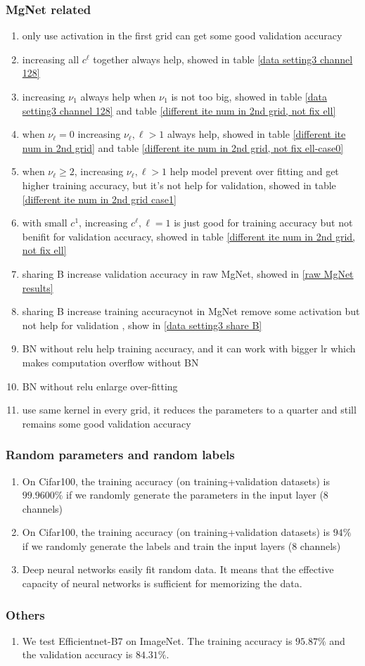 \subsubsection{MgNet related}
\begin{enumerate}
	\item only use activation in the first grid can get some good validation accuracy
	\item increasing all $c^\ell$ together always help, showed in table \ref{data setting3  channel 128}
	\item increasing $\nu_1$ always help when $\nu_1$ is not too big, showed in table \ref{data setting3  channel 128} and table \ref{different ite num in 2nd grid, not fix ell}
	\item when $\nu_\ell=0$ increasing $\nu_\ell, \ell>1$  always help, showed in table \ref{different ite num in 2nd grid} and table \ref{different ite num in 2nd grid, not fix ell-case0}
	
	\item when $\nu_\ell \geq 2$, increasing $\nu_\ell, \ell>1$ help model prevent over fitting and get higher training accuracy, but it's not help for validation, showed in table \ref{different ite num in 2nd grid case1}
	\item with small $c^1$, increasing $c^\ell, \ell=1$ is just good for training accuracy but not benifit for validation accuracy, showed in table \ref{different ite num in 2nd grid, not fix ell}
	\item sharing B increase validation accuracy in raw MgNet, showed in \ref{raw MgNet results}
	\item sharing B increase training accuracynot in MgNet remove some activation but not help for validation , show in \ref{data setting3  share B} 	
	\item BN without relu help training accuracy, and it can work with bigger lr which makes computation overflow without BN
	\item BN without relu enlarge over-fitting
	\item use same kernel in every grid, it reduces the parameters to a quarter and still remains some good validation accuracy
\end{enumerate}
\subsubsection{Random parameters and random labels}
\begin{enumerate}
	\item On Cifar100, the training accuracy (on training+validation datasets) is $99.9600\%$ if we randomly generate the parameters in the input layer (8 channels)
	\item On Cifar100, the training accuracy (on training+validation datasets) is $94\%$ if we randomly generate the labels and train the input layers (8 channels)
	\item Deep neural networks easily fit random data. It means that the effective capacity of neural networks is sufficient for memorizing the data.
\end{enumerate}

\subsubsection{Others}
\begin{enumerate}
	\item We test Efficientnet-B7 on ImageNet. The training accuracy is $95.87\%$ and the validation accuracy is $84.31\%$.	
\end{enumerate}
